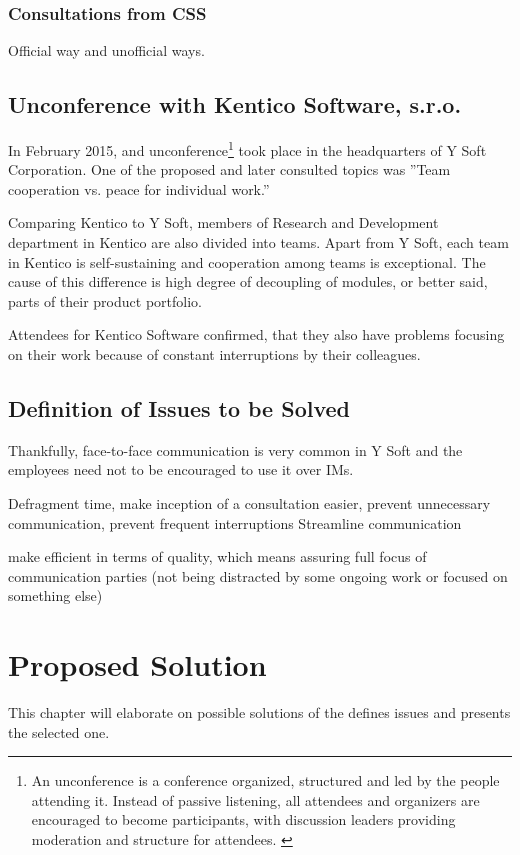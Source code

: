 \documentclass[11pt,singleside]{myfithesis2}
\begin{document}
		\subsection{Consultations from CSS}
Official way and unofficial ways.

	\section{Unconference with Kentico Software, s.r.o.}
In February 2015, and unconference\footnote{An unconference is a conference organized, structured and led by the people attending it. Instead of passive listening, all attendees and organizers are encouraged to become participants, with discussion leaders providing moderation and structure for attendees. \cite{unconference}} took place in the headquarters of Y Soft Corporation. One of the proposed and later consulted topics was ''Team cooperation vs. peace for individual work.''

Comparing Kentico to Y Soft, members of Research and Development department in Kentico are also divided into teams. Apart from Y Soft, each team in Kentico is self-sustaining and cooperation among teams is exceptional. The cause of this difference is high degree of decoupling of modules, or better said, parts of their product portfolio.

Attendees for Kentico Software confirmed, that they also have problems focusing on their work because of constant interruptions by their colleagues. 

	\section{Definition of Issues to be Solved}

Thankfully, face-to-face communication is very common in Y Soft and the employees need not to be encouraged to use it over  IMs.

Defragment time, make inception of a consultation easier, prevent unnecessary communication, prevent frequent interruptions
Streamline communication

make efficient in terms of quality, which means assuring full focus of communication parties (not being distracted by some ongoing work or focused on something else)

\chapter{Proposed Solution}
This chapter will elaborate on possible solutions of the defines issues and presents the selected one.
\end{document}
